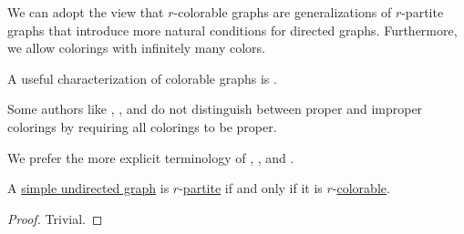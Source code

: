 \begin{comments}
  \item We can adopt the view that \( r \)-colorable graphs are generalizations of \( r \)-partite graphs that introduce more natural conditions for directed graphs. Furthermore, we allow colorings with infinitely many colors.

  \item A useful characterization of colorable graphs is .

  \item Some authors like , ,  and  do not distinguish between proper and improper colorings by requiring all colorings to be proper.

  We prefer the more explicit terminology of , ,  and .
\end{comments}

\begin{proposition}\label{thm:k_colorable_iff_multipartite}
  A \hyperref[def:undirected_graph]{simple undirected graph} is \( r \)-\hyperref[def:multipartite_graph]{partite} if and only if it is \( r \)-\hyperref[def:graph_coloring/colorable]{colorable}.
\end{proposition}
\begin{proof}
  Trivial.
\end{proof}

